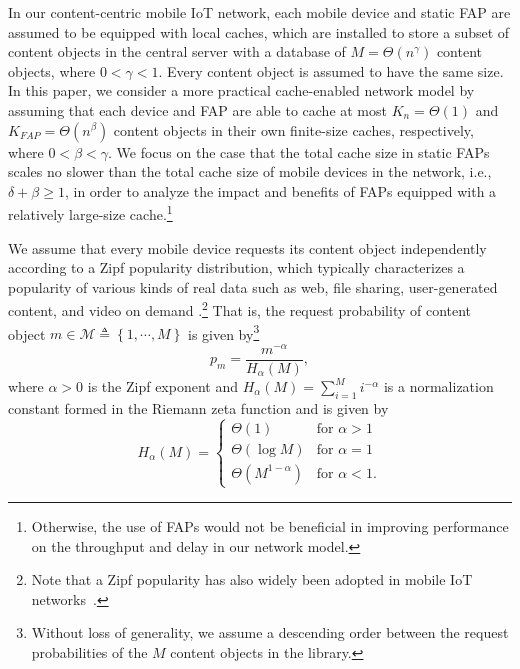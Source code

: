 \documentclass[10pt,journal,compsoc,onecolumn]{IEEEtran}
\begin{document}
In our content-centric mobile IoT network, each mobile device and static FAP are assumed to be equipped with local caches, which are installed
to store a subset of content objects in the central server with a database of
$M=\Theta(n^{\gamma})$ content objects, where $0 < \gamma<1$. Every content object
is assumed to have the same size. In this paper, we consider a
more practical cache-enabled network model by assuming that each
device and FAP are able to cache at most $K_n=\Theta(1)$ and
$K_{FAP}=\Theta(n^{\beta})$ content objects in their own
finite-size caches, respectively, where $0 < \beta<\gamma$. We
focus on the case that the total cache size in static FAPs scales no
slower than the total cache size of mobile devices in the network,
i.e., $\delta+\beta \geq 1$, in order to analyze the impact and
benefits of FAPs equipped with a relatively large-size
cache.\footnote{Otherwise, the use of FAPs would not be beneficial
in improving performance on the throughput and delay in our
network model.}

We assume that every mobile device requests its content object
independently according to a Zipf popularity distribution, which
typically characterizes a popularity of various kinds of real data
such as web, file sharing, user-generated content, and video on
demand \cite{c6}.\footnote{Note that a
Zipf popularity has also widely been adopted in mobile
IoT networks~\cite{Zipf,Zipf1}.} That is, the request probability of
content object $m \in \mathcal{M}\triangleq \left\lbrace 1,\cdots,M
\right\rbrace $ is given by\footnote{Without loss of generality,
we assume a descending order between the request probabilities of
the $M$ content objects in the library.}
\begin{equation}
\label{eq1}
p_m=\frac{m^{-\alpha}}{H_{\alpha}(M)},
\end{equation}
where $\alpha>0$ is the Zipf exponent and $H_{\alpha}(M)=\sum_{i=1}^M i^{-\alpha}$ is a normalization constant formed in the Riemann zeta function and is given by
\begin{equation}
\label{equa9} H_{\alpha}(M) =
  \begin{cases}
   \Theta(1)& \mbox{for } \alpha>1 \\
   \Theta(\log M) & \mbox{for }\alpha=1 \\
      \Theta(M^{1-\alpha}) & \mbox{for }\alpha<1.
  \end{cases}
\end{equation}

\end{document}
